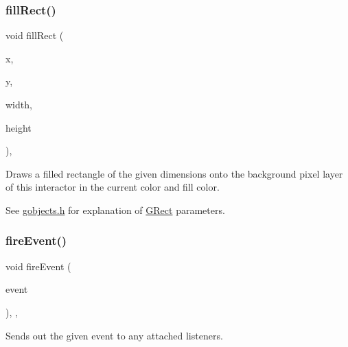 \subsubsection{\texorpdfstring{fill\+Rect()}{fillRect()}\hspace{0.1cm}{\footnotesize\ttfamily [2/2]}}
{\footnotesize\ttfamily void fill\+Rect (\begin{DoxyParamCaption}\item[{double}]{x,  }\item[{double}]{y,  }\item[{double}]{width,  }\item[{double}]{height }\end{DoxyParamCaption})\hspace{0.3cm}{\ttfamily [virtual]}, {\ttfamily [inherited]}}



Draws a filled rectangle of the given dimensions onto the background pixel layer of this interactor in the current color and fill color. 

See \mbox{\hyperlink{gobjects_8h_source}{gobjects.\+h}} for explanation of \mbox{\hyperlink{classGRect}{G\+Rect}} parameters. \mbox{\label{classGObservable_a63e5e5a6227c59c928493b11aceb0f67}} 
\subsubsection{\texorpdfstring{fire\+Event()}{fireEvent()}}
{\footnotesize\ttfamily void fire\+Event (\begin{DoxyParamCaption}\item[{\mbox{\hyperlink{classGEvent}{G\+Event}} \&}]{event }\end{DoxyParamCaption})\hspace{0.3cm}{\ttfamily [protected]}, {\ttfamily [virtual]}, {\ttfamily [inherited]}}



Sends out the given event to any attached listeners. 

\mbox{\label{classGObservable_ab3983ea07337b52020a29cc00c653d8d}} 
